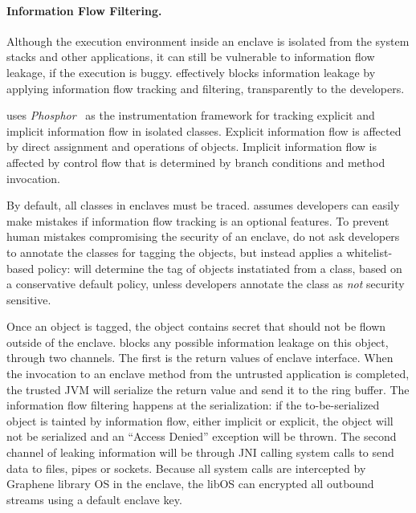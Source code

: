 \paragraph{Information Flow Filtering.}
Although the execution environment inside an enclave is isolated
from the system stacks and other applications,
it can still be vulnerable to information flow leakage,
if the execution is buggy.
\sysname{} effectively blocks information leakage
by applying information flow tracking and filtering, transparently
to the developers.

\sysname{} uses {\em Phosphor}~\cite{bell2014phosphor}
as the instrumentation framework for
tracking explicit and implicit information flow in isolated \java{} classes.
Explicit information flow is affected by direct assignment
and operations of objects.
Implicit information flow is affected by control flow that is determined by
branch conditions and method invocation.

By default, all classes in enclaves must be traced.
\sysname{} assumes
developers can easily make mistakes if
information flow tracking is an optional features.
To prevent human mistakes compromising the security of an enclave,
\sysname{} do not ask developers to annotate the classes
for tagging the objects,
but instead applies a whitelist-based policy:
\sysname{} will determine the tag of objects instatiated from a class,
based on a conservative default policy,
unless developers annotate the class as {\em not} security sensitive.

Once an object is tagged, the object contains secret that should not be
flown outside of the enclave.
\sysname{} blocks any possible information leakage on this object,
through two channels.
The first is the return values of enclave interface.
When the invocation to an enclave method from the untrusted application
is completed,
the trusted JVM will serialize the return value and
send it to the ring buffer.
The information flow filtering happens at the serialization:
if the to-be-serialized object is tainted by information flow,
either implicit or explicit,
the object will not be serialized and an ``Access Denied''
exception will be thrown.
The second channel of leaking information will be through
JNI calling system calls
to send data to files, pipes or sockets.
Because all system calls are intercepted by
Graphene library OS in the enclave,
the libOS can encrypted all outbound streams using a default enclave key.

